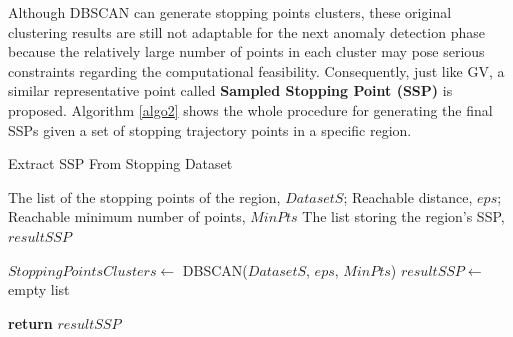\documentclass[12pt,glossary]{dalcsthesis}
\begin{document}


Although DBSCAN \cite{DBScan96} can generate stopping points clusters, these original clustering results are still not adaptable for the next anomaly detection phase because the relatively large number of points in each cluster may pose serious constraints regarding the computational feasibility. Consequently, just like GV, a similar representative point called  \textbf{Sampled Stopping Point (SSP)} is proposed. Algorithm \ref{algo2} shows the whole procedure for generating the final SSPs given a set of stopping trajectory points in a specific region. 

\begin{algorithm}
\caption{Extract SSP From Stopping Dataset}
\label{algo2}
\begin{algorithmic}[1]
\Require The list of the stopping points of the region, $DatasetS$; Reachable distance, $eps$;  Reachable minimum number of points, $MinPts$
\Ensure The list storing the region's SSP, $resultSSP$

\State $StoppingPointsClusters \gets$ DBSCAN($DatasetS$, $eps$, $MinPts$)
\State $resultSSP \gets$ empty list
    
    \Else 
    \EndIf
        \EndIf    
    \EndWhile
\EndFor
\State \textbf{return} $resultSSP$
\end{algorithmic}
\end{algorithm}
\end{document}
